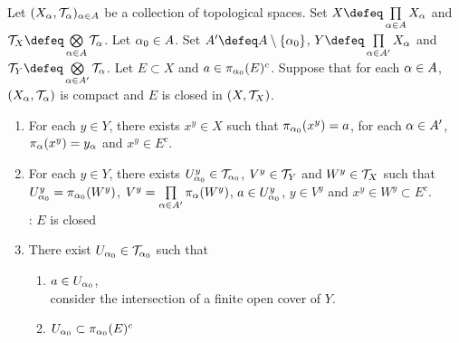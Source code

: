 \documentclass{book}
\begin{document}
 	\begin{ex} 
 		Let $(X_{\alpha}, \mathcal{T}_{\alpha})_{\alpha \in A}$ be a collection of topological spaces. Set $X \defeq \prod\limits_{\al \in A} X_{\al}$ and $\MT_X \defeq \bigotimes\limits_{\al \in A} \MT_{\al}$. Let $\alpha_0 \in A$. Set $A' \defeq A \setminus \{\al_0\}$,  $Y \defeq \prod\limits_{\al \in A'}X_{\al}$ and $\MT_Y \defeq \bigotimes\limits_{\al \in A'} \MT_{\al}$. Let $E \subset X$ and $a \in \pi_{\alpha_0}(E)^c$. Suppose that for each $\alpha \in A$, $(X_{\alpha} , \mathcal{T}_{\alpha})$ is compact and $E$ is closed in $(X, \mathcal{T}_X)$.
 		\begin{enumerate}
 			\item For each $y \in Y$, there exists $x^y \in X$ such that $\pi_{\alpha_0}(x^y) = a$, for each $\alpha \in A'$, $\pi_{\alpha}(x^y) = y_{\alpha}$ and $x^y \in E^c$.
 			\item For each $y \in Y$, there exists $U^y_{\alpha_0} \in \mathcal{T}_{\alpha_0}$, $V^y \in \mathcal{T}_Y$ and $W^y \in \mathcal{T}_X$ such that $U^y_{\alpha_0} = \pi_{\alpha_0}(W^y)$, $V^y = \prod\limits_{\alpha \in A'} \pi_{\alpha}(W^y)$, $a \in U^y_{\alpha_0}$, $y \in V^y$ and $x^y \in W^y \subset E^c$. \\
 			: $E$ is closed
 			\item There exist $U_{\alpha_0} \in \mathcal{T}_{\alpha_0}$ such that 
 			\begin{enumerate}
 				\item $a \in U_{\alpha_0}$, \\
 				 consider the intersection of a finite open cover of $Y$.
 				\item $U_{\alpha_0} \subset \pi_{\alpha_0}(E)^c$ \\
 			\end{enumerate}
 		\end{enumerate}
 	\end{ex}
 	
\end{document}
